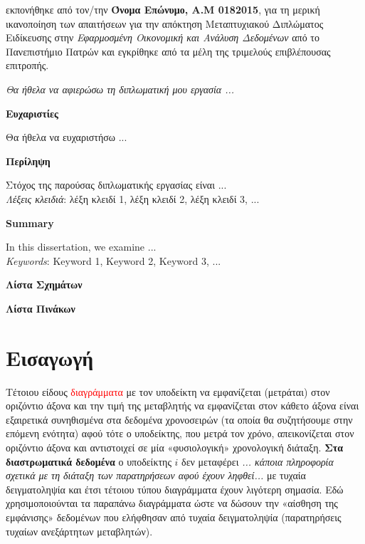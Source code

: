 \documentclass[12pt,a4paper,oneside]{book}
\newcommand{\la}{\latintext}
\begin{document}
εκπονήθηκε από τον/την \textbf{Όνομα Επώνυμο, Α.Μ 0182015}, για τη μερική ικανοποίηση των απαιτήσεων για την απόκτηση Μεταπτυχιακού Διπλώματος Ειδίκευσης στην \textit{\guillemotleft Εφαρμοσμένη Οικονομική και Ανάλυση Δεδομένων\guillemotright} από το Πανεπιστήμιο Πατρών και εγκρίθηκε από τα μέλη της τριμελούς επιβλέπουσας επιτροπής.

\newpage
\thispagestyle{empty}
\bigskip
\textsl{Θα ήθελα να αφιερώσω τη διπλωματική μου εργασία ...}
\newpage

\newpage
\thispagestyle{empty}
\begin{center}
	\textbf{Ευχαριστίες}\\
\end{center}
{Θα ήθελα να ευχαριστήσω ...}\\


\newpage
{}
\begin{center}
	\textbf{Περίληψη}\\
\end{center}
Στόχος της παρούσας διπλωματικής εργασίας είναι ... 
\bigskip
\bigskip
\\
\textsl{Λέξεις κλειδιά}: {λέξη κλειδί 1, λέξη κλειδί 2, λέξη κλειδί 3, ...}


\newpage
{\la

\begin{center}
	\textbf{Summary}\\
\end{center}
In this dissertation, we examine ... 
\bigskip
\bigskip
\\
\textsl{Keywords}: {Keyword 1, Keyword 2, Keyword 3, ...}

}


\newpage
\tableofcontents
\clearpage

\renewcommand\listfigurename{}\textbf{Λίστα Σχημάτων}
\listoffigures
\clearpage

\renewcommand\listtablename{}\textbf{Λίστα Πινάκων}
\listoftables
\clearpage


\newpage

\doublespacing
\chapter{Εισαγωγή}
Τέτοιου είδους \textcolor{red}{διαγράμματα} με τον \colorbox{UniBlue}{υποδείκτη} να εμφανίζεται (μετράται) στον οριζόντιο άξονα και την τιμή της μεταβλητής να εμφανίζεται στον κάθετο άξονα είναι εξαιρετικά συνηθισμένα στα δεδομένα χρονοσειρών (τα οποία θα συζητήσουμε στην επόμενη ενότητα) αφού τότε ο υποδείκτης, που μετρά τον χρόνο, απεικονίζεται στον οριζόντιο άξονα και αντιστοιχεί σε μία «φυσιολογική» χρονολογική διάταξη. \textbf{Στα διαστρωματικά δεδομένα} ο υποδείκτης $i$ δεν μεταφέρει \textit{... κάποια πληροφορία σχετικά με τη διάταξη των παρατηρήσεων αφού έχουν ληφθεί...} με τυχαία δειγματοληψία και έτσι τέτοιου τύπου διαγράμματα έχουν λιγότερη σημασία. Εδώ χρησιμοποιούνται τα παραπάνω διαγράμματα ώστε να δώσουν την «αίσθηση της εμφάνισης» δεδομένων που ελήφθησαν από τυχαία δειγματοληψία (παρατηρήσεις τυχαίων ανεξάρτητων μεταβλητών).
\end{document}
